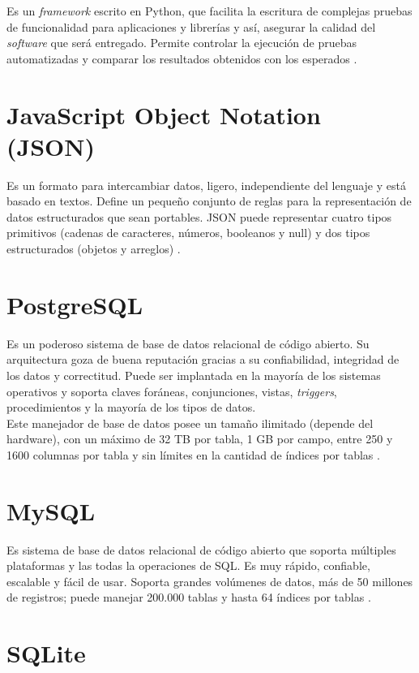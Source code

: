 Es un \textit{framework} escrito en Python, que facilita la escritura de
complejas pruebas de funcionalidad para aplicaciones y librerías y así,
asegurar la calidad del \textit{software} que será entregado. Permite controlar
la ejecución de pruebas automatizadas y comparar los resultados obtenidos con los esperados \cite{pytest}.

\section{JavaScript Object Notation (JSON)}

Es un formato para intercambiar datos, ligero, independiente del lenguaje y está basado en textos. Define un pequeño conjunto de reglas para la representación de datos estructurados que sean portables. JSON puede representar cuatro tipos primitivos (cadenas de caracteres, números, booleanos y null) y dos tipos estructurados (objetos y arreglos) \cite{JSON}.

\section{PostgreSQL}

Es un poderoso sistema de base de datos relacional de código abierto. Su arquitectura goza de buena reputación gracias a su confiabilidad, integridad de los datos y correctitud. Puede ser implantada en la mayoría de los sistemas operativos y soporta claves foráneas, conjunciones, vistas, \textit{triggers}, procedimientos y la mayoría de los tipos de datos. \\

Este manejador de base de datos posee un tamaño ilimitado (depende del
hardware), con un máximo de 32 TB por tabla, 1 GB por campo, entre 250 y 1600
columnas por tabla y sin límites en la cantidad de índices por tablas
\cite{PostgreSQL}.

\section{MySQL}

Es sistema de base de datos relacional de código abierto que soporta múltiples plataformas y las todas la operaciones de SQL. Es muy rápido, confiable, escalable y fácil de usar. Soporta grandes volúmenes de datos, más de 50 millones de registros; puede manejar 200.000 tablas y hasta 64 índices por tablas \cite{MySQL}.

\section{SQLite}

